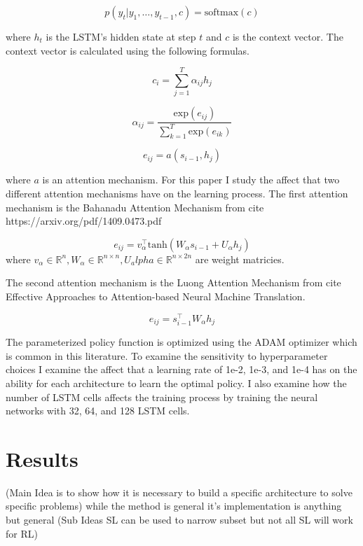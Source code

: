\documentclass[12pt]{article}
\begin{document}
\begin{equation*}
  p(y_t|y_1,\dots,y_{t-1}, c)=\text{softmax}(c)
\end{equation*}

where $h_t$ is the LSTM's hidden state at step $t$ and $c$ is the context vector. The context vector is calculated using the following formulas.

\begin{equation*}
  c_i=\sum_{j=1}^T \alpha_{ij}h_j
\end{equation*}

\begin{equation*}
  \alpha_{ij}=\frac{\text{exp}(e_{ij})}{\sum_{k=1}^T\text{exp}(e_{ik})}
\end{equation*}

\begin{equation*}
  e_{ij}=a(s_{i-1},h_j)
\end{equation*}

where $a$ is an attention mechanism. For this paper I study the affect that two different attention mechanisms have on the learning process. The first attention mechanism is the Bahanadu Attention Mechanism from cite https://arxiv.org/pdf/1409.0473.pdf

\begin{equation*}
  e_{ij}=v_\alpha^\top\text{tanh}(W_\alpha s_{i-1}+U_\alpha h_j)
\end{equation*}
where $v_\alpha \in \mathbb{R}^n, W_\alpha \in \mathbb{R}^{n \times n},U_alpha \in \mathbb{R}^{n \times 2n}$ are weight matricies.

The second attention mechanism is the Luong Attention Mechanism from cite Effective Approaches to Attention-based Neural Machine Translation.

\begin{equation*}
  e_{ij}= s_{i-1}^\top W_\alpha h_j
\end{equation*}

The parameterized policy function is optimized using the ADAM optimizer which is common in this literature. To examine the sensitivity to hyperparameter choices I examine the affect that a learning rate of 1e-2, 1e-3, and 1e-4 has on the ability for each architecture to learn the optimal policy. I also examine how the number of LSTM cells affects the training process by training the neural networks with 32, 64, and 128 LSTM cells.



\section{Results}
(Main Idea is to show how it is necessary to build a specific architecture to solve specific problems)
    while the method is general it's implementation is anything but general
(Sub Ideas SL can be used to narrow subset but not all SL will work for RL)
\end{document}
